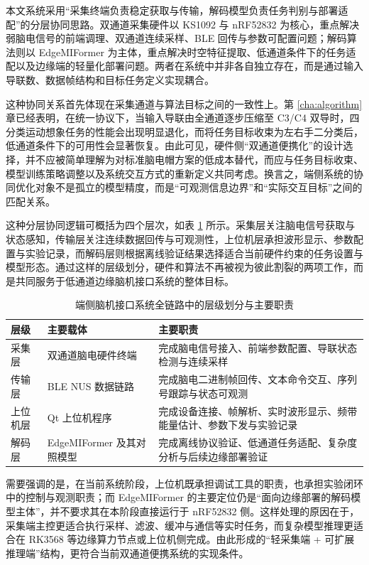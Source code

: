 本文系统采用“采集终端负责稳定获取与传输，解码模型负责任务判别与部署适配”的分层协同思路。双通道采集硬件以 KS1092 与 nRF52832 为核心，重点解决弱脑电信号的前端调理、双通道连续采样、BLE 回传与参数可配置问题；解码算法则以 EdgeMIFormer 为主体，重点解决时空特征提取、低通道条件下的任务适配以及边缘端的轻量化部署问题。两者在系统中并非各自独立存在，而是通过输入导联数、数据帧结构和目标任务定义实现耦合。

这种协同关系首先体现在采集通道与算法目标之间的一致性上。第 \ref{cha:algorithm} 章已经表明，在统一协议下，当输入导联由全通道逐步压缩至 C3/C4 双导时，四分类运动想象任务的性能会出现明显退化，而将任务目标收束为左右手二分类后，低通道条件下的可用性会显著恢复。由此可见，硬件侧“双通道便携化”的设计选择，并不应被简单理解为对标准脑电帽方案的低成本替代，而应与任务目标收束、模型训练策略调整以及系统交互方式的重新定义共同考虑。换言之，端侧系统的协同优化对象不是孤立的模型精度，而是“可观测信息边界”和“实际交互目标”之间的匹配关系。

这种分层协同逻辑可概括为四个层次，如表 \ref{tab:c5_end2end_layers} 所示。采集层关注脑电信号获取与状态感知，传输层关注连续数据回传与可观测性，上位机层承担波形显示、参数配置与实验记录，而解码层则根据离线验证结果选择适合当前硬件约束的任务设置与模型形态。通过这样的层级划分，硬件和算法不再被视为彼此割裂的两项工作，而是共同服务于低通道边缘脑机接口系统的整体目标。

\begin{table}[htbp]
    \centering
    \caption{端侧脑机接口系统全链路中的层级划分与主要职责}
    \label{tab:c5_end2end_layers}
    \begin{tabular}{p{2.8cm}p{4.0cm}p{6.3cm}}
        \hline
        层级 & 主要载体 & 主要职责 \\
        \hline
        采集层 & 双通道脑电硬件终端 & 完成脑电信号接入、前端参数配置、导联状态检测与连续采样 \\
        传输层 & BLE NUS 数据链路 & 完成脑电二进制帧回传、文本命令交互、序列号跟踪与状态可观测 \\
        上位机层 & Qt 上位机程序 & 完成设备连接、帧解析、实时波形显示、频带能量估计、参数下发与实验记录 \\
        解码层 & EdgeMIFormer 及其对照模型 & 完成离线协议验证、低通道任务适配、复杂度分析与后续边缘部署验证 \\
        \hline
    \end{tabular}
\end{table}

需要强调的是，在当前系统阶段，上位机既承担调试工具的职责，也承担实验闭环中的控制与观测职责；而 EdgeMIFormer 的主要定位仍是“面向边缘部署的解码模型主体”，并不要求其在本阶段直接运行于 nRF52832 侧。这样处理的原因在于，采集端主控更适合执行采样、滤波、缓冲与通信等实时任务，而复杂模型推理更适合在 RK3568 等边缘算力节点或上位机侧完成。由此形成的“轻采集端 + 可扩展推理端”结构，更符合当前双通道便携系统的实现条件。


